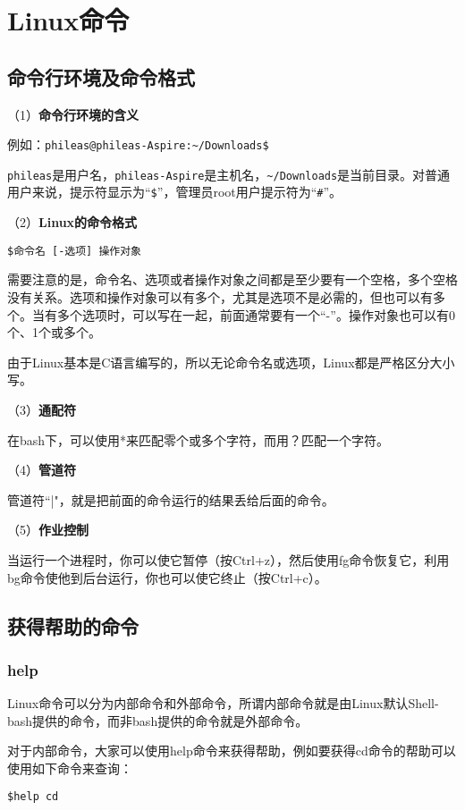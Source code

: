 \chapter{Linux命令}
\section{命令行环境及命令格式}
（1）\textbf{命令行环境的含义}

例如：\verb*|phileas@phileas-Aspire:~/Downloads$|

\verb|phileas|是用户名，\verb|phileas-Aspire|是主机名，\verb|~/Downloads|是当前目录。对普通用户来说，提示符显示为“\verb|$|”，管理员root用户提示符为“\verb|#|”。


（2）\textbf{Linux的命令格式}

\verb*|$命令名 [-选项] 操作对象|

需要注意的是，命令名、选项或者操作对象之间都是至少要有一个空格，多个空格没有关系。选项和操作对象可以有多个，尤其是选项不是必需的，但也可以有多个。当有多个选项时，可以写在一起，前面通常要有一个“-”。操作对象也可以有0个、1个或多个。

由于Linux基本是C语言编写的，所以无论命令名或选项，Linux都是严格区分大小写。

（3）\textbf{通配符}

在bash下，可以使用*来匹配零个或多个字符，而用？匹配一个字符。

（4）\textbf{管道符}

管道符``|"，就是把前面的命令运行的结果丢给后面的命令。

（5）\textbf{作业控制}

当运行一个进程时，你可以使它暂停（按Ctrl+z），然后使用fg命令恢复它，利用bg命令使他到后台运行，你也可以使它终止（按Ctrl+c）。





\section{获得帮助的命令}
\subsection{help}
Linux命令可以分为内部命令和外部命令，所谓内部命令就是由Linux默认Shell-bash提供的命令，而非bash提供的命令就是外部命令。

对于内部命令，大家可以使用help命令来获得帮助，例如要获得cd命令的帮助可以使用如下命令来查询：

\verb*|$help cd|

